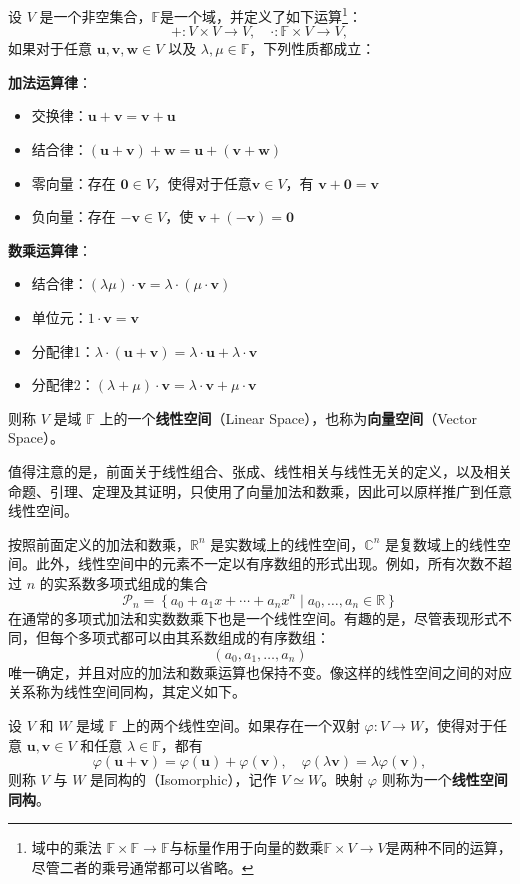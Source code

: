 \begin{definition}[线性空间]
    \label{def_linear_space}
    设 \(V\) 是一个非空集合，\( \mathbb F \)是一个域，并定义了如下运算\footnote{域中的乘法 \(\mathbb F\times\mathbb F\to\mathbb F\)与标量作用于向量的数乘\(\mathbb F\times V\to V\)是两种不同的运算，尽管二者的乘号通常都可以省略。}：
    \[
        +:V\times V\to V,\quad \cdot:\mathbb F\times V\to V,
    \]
    如果对于任意 \(\bm u,\bm v,\bm w\in V\) 以及 \(\lambda,\mu\in\mathbb F\)，下列性质都成立：

    \textbf{加法运算律}：
    \begin{itemize}
        \item 交换律：\(\bm u+\bm v=\bm v+\bm u\)
        \item 结合律：\((\bm u+\bm v)+\bm w=\bm u+(\bm v+\bm w)\)
        \item 零向量：存在 \(\bm 0\in V\)，使得对于任意\( \bm{v} \in V \)，有 \(\bm v+\bm 0=\bm v\)
        \item 负向量：存在 \(-\bm v\in V\)，使 \(\bm v+(-\bm v)=\bm 0\)
    \end{itemize}
    \textbf{数乘运算律}：
    \begin{itemize}
        \item 结合律：\((\lambda\mu) \cdot \bm v=\lambda \cdot (\mu \cdot\bm v)\)
        \item 单位元：\(1\cdot \bm v=\bm v\)
        \item 分配律1：\(\lambda \cdot (\bm u+\bm v)=\lambda\cdot\bm u+\lambda\cdot\bm v\)
        \item 分配律2：\((\lambda+\mu)\cdot\bm v=\lambda\cdot\bm v+\mu\cdot\bm v\)
    \end{itemize}
    则称 \(V\) 是域 \(\mathbb F\) 上的一个\textbf{线性空间}（Linear Space），也称为\textbf{向量空间}（Vector Space）。
\end{definition}

值得注意的是，前面关于线性组合、张成、线性相关与线性无关的定义，以及相关命题、引理、定理及其证明，只使用了向量加法和数乘，因此可以原样推广到任意线性空间。

按照前面定义的加法和数乘，\(\mathbb R^n\) 是实数域上的线性空间，\(\mathbb C^n\) 是复数域上的线性空间。此外，线性空间中的元素不一定以有序数组的形式出现。例如，所有次数不超过 \(n\) 的实系数多项式组成的集合
\[
    \mathcal P_n
    =\left\{a_0+a_1x+\cdots+a_nx^n\mid a_0,\ldots,a_n\in\mathbb R\right\}
\]
在通常的多项式加法和实数数乘下也是一个线性空间。有趣的是，尽管表现形式不同，但每个多项式都可以由其系数组成的有序数组：
\[
    (a_0,a_1,\ldots,a_n)
\]
唯一确定，并且对应的加法和数乘运算也保持不变。像这样的线性空间之间的对应关系称为线性空间同构，其定义如下。
\begin{definition}
    \label{def_linear_space_isomorphism}
    设 \(V\) 和 \(W\) 是域 \(\mathbb F\) 上的两个线性空间。如果存在一个双射 \(\varphi:V\to W\)，使得对于任意 \(\bm u,\bm v\in V\) 和任意 \(\lambda\in\mathbb F\)，都有
    \[
        \varphi(\bm u+\bm v)=\varphi(\bm u)+\varphi(\bm v),\quad \varphi(\lambda \bm v)=\lambda \varphi(\bm v),
    \]
    则称 \(V\) 与 \(W\) 是同构的（Isomorphic），记作 \(V\simeq W\)。映射 \(\varphi\) 则称为一个\textbf{线性空间同构}。
\end{definition}

